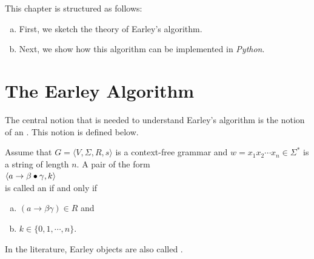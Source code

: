 This chapter is structured as follows:
\begin{enumerate}[(a)]
\item First, we sketch the theory of Earley's algorithm.
\item Next, we show how this algorithm can be implemented in \textsl{Python}.
\end{enumerate}

\section{The Earley Algorithm}
The central notion that is needed to understand Earley's algorithm is the notion of an
.  This notion is defined below.

\begin{Definition}
  Assume that  $G = \langle V, \Sigma, R, s \rangle$ is a context-free grammar and
  $w = x_1x_2 \cdots x_n \in \Sigma^*$ is a string of length $n$.  A pair of the form
  \\[0.2cm]
  \hspace*{1.3cm}
  $\langle a \rightarrow \beta \mdot \gamma, k \rangle$
  \\[0.2cm]
  is called an  if and only if
  \begin{enumerate}[(a)]
  \item $(a \rightarrow \beta\gamma) \in R$ \quad and
  \item $k \in \{0,1,\cdots,n\}$. \eox
  \end{enumerate}
\end{Definition}

\noindent
In the literature, Earley objects are also called .


